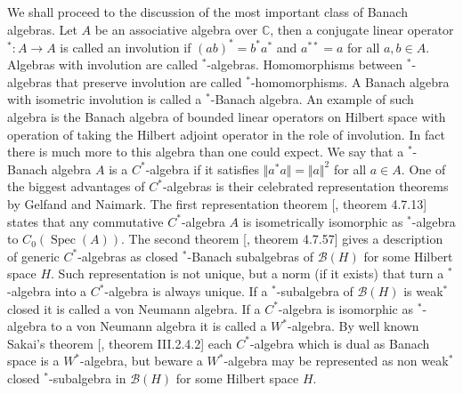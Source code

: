 We shall proceed to the discussion of the most important class of Banach algebras. Let $A$ be an associative algebra over $\mathbb{C}$, then a conjugate linear operator ${}^*:A\to A$ is called an involution if $(ab)^*=b^*a^*$ and $a^{**}=a$ for all $a,b\in A$. Algebras with involution are called ${}^*$-algebras. Homomorphisms between ${}^*$-algebras that preserve involution are called ${}^*$-homomorphisms. A Banach algebra with isometric involution is called a ${}^*$-Banach algebra. An example of such algebra is the Banach algebra of bounded linear operators on Hilbert space with operation of taking the Hilbert adjoint operator in the role of involution. In fact there is much more to this algebra than one could expect. We say that a ${}^*$-Banach algebra $A$ is a $C^*$-algebra if it satisfies $\Vert a^*a\Vert=\Vert a\Vert^2$ for all $a\in A$. One of the biggest advantages of $C^*$-algebras is their celebrated representation theorems by Gelfand and Naimark. The first representation theorem [\cite{HelBanLocConvAlg}, theorem 4.7.13] states that any commutative $C^*$-algebra $A$ is isometrically isomorphic as ${}^*$-algebra to $C_0(\operatorname{Spec}(A))$. The second theorem [\cite{HelBanLocConvAlg}, theorem 4.7.57] gives a description of generic $C^*$-algebras as closed ${}^*$-Banach subalgebras of $\mathcal{B}(H)$ for some Hilbert space $H$. Such representation is not unique, but a norm (if it exists) that turn a ${}^*$-algebra into a $C^*$-algebra is always unique. If a ${}^*$-subalgebra of $\mathcal{B}(H)$ is weak${}^*$ closed it is called a von Neumann algebra. If a $C^*$-algebra is isomorphic as ${}^*$-algebra to a von Neumann algebra it is called a $W^*$-algebra. By well known Sakai's theorem [\cite{BlackadarOpAlg}, theorem III.2.4.2] each $C^*$-algebra which is dual as Banach space is a $W^*$-algebra, but beware a $W^*$-algebra may be represented as non weak${}^*$ closed ${}^*$-subalgebra in $\mathcal{B}(H)$ for some Hilbert space $H$. 


